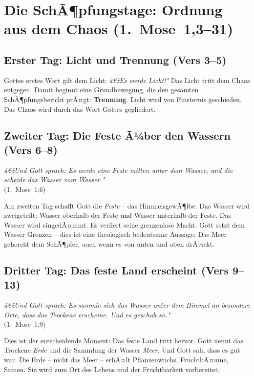 ﻿\documentclass[a4paper,12pt]{article}
\theoremstyle{definition}
\begin{document}
\section{Die SchÃ¶pfungstage: Ordnung aus dem Chaos (1.~Mose~1,3--31)}

\subsection{Erster Tag: Licht und Trennung (Vers 3--5)}

Gottes erstes Wort gilt dem Licht: \textit{â€žEs werde Licht!"} Das Licht tritt
dem Chaos entgegen. Damit beginnt eine Grundbewegung, die den gesamten
SchÃ¶pfungsbericht prÃ¤gt: \textbf{Trennung}. Licht wird von Finsternis geschieden.
Das Chaos wird durch das Wort Gottes gegliedert.

\subsection{Zweiter Tag: Die Feste Ã¼ber den Wassern (Vers 6--8)}

\begin{displayquote}
    \textit{â€žUnd Gott sprach: Es werde eine Feste mitten unter dem Wasser, und
    die scheide das Wasser vom Wasser."}\\
    \hfill (1.~Mose~1,6)
\end{displayquote}

Am zweiten Tag schafft Gott die \textit{Feste} -- das HimmelsgewÃ¶lbe. Das Wasser
wird zweigeteilt: Wasser oberhalb der Feste und Wasser unterhalb der Feste.
Das Wasser wird eingedÃ¤mmt. Es verliert seine grenzenlose Macht. Gott setzt dem
Wasser Grenzen -- dies ist eine theologisch bedeutsame Aussage: Das Meer gehorcht
dem SchÃ¶pfer, auch wenn es von unten und oben drÃ¼ckt.

\subsection{Dritter Tag: Das feste Land erscheint (Vers 9--13)}

\begin{displayquote}
    \textit{â€žUnd Gott sprach: Es sammle sich das Wasser unter dem Himmel an
    besondere Orte, dass das Trockene erscheine. Und es geschah so."}\\
    \hfill (1.~Mose~1,9)
\end{displayquote}

Dies ist der entscheidende Moment: Das feste Land tritt hervor. Gott nennt das
Trockene \textit{Erde} und die Sammlung der Wasser \textit{Meer}. Und Gott sah,
dass es gut war. Die Erde -- nicht das Meer -- erhÃ¤lt Pflanzenwuchs, FruchtbÃ¤ume,
Samen. Sie wird zum Ort des Lebens und der Fruchtbarkeit vorbereitet.
\end{document}
